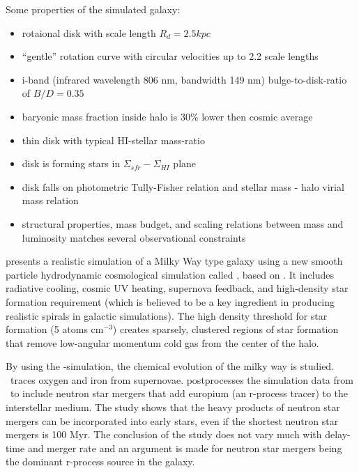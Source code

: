 Some properties of the simulated galaxy:
\begin{itemize}
\item{rotaional disk with scale length $R_d=2.5kpc$}
\item{``gentle'' rotation curve with circular velocities up to 2.2
  scale lengths}
\item{i-band (infrared wavelength 806 nm, bandwidth 149 nm)
  bulge-to-disk-ratio of $B/D=0.35$}
\item{baryonic mass fraction inside halo is 30\% lower then
  cosmic average}
\item{thin disk with typical HI-stellar mass-ratio}
\item{disk is forming stars in $\Sigma_{sfr}-\Sigma_{HI}$ plane}
\item{disk falls on photometric Tully-Fisher relation and
  stellar mass - halo virial mass relation}
\item{structural properties, mass budget, and scaling relations between mass and luminosity matches several observational constraints}
\end{itemize}

\setlength{}
\begin{figure}[h]
  
\end{figure}

 presents a realistic simulation of a Milky Way type galaxy using a new smooth particle hydrodynamic cosmological simulation called \eris, based on \gasoline{}. It includes radiative cooling, cosmic UV heating, supernova feedback, and high-density star formation requirement (which is believed to be a key ingredient in producing realistic spirals in galactic simulations).
The high density threshold for star formation (5 atoms cm$^{-3}$) creates sparsely, clustered regions of star formation that remove low-angular momentum cold gas from the center of the halo. 

By using the \eris-simulation, the chemical evolution of the milky way is studied.
\eris\ traces oxygen and iron from supernovae.
 postprocesses the simulation data from \eris\ to include neutron star mergers that add europium (an r-process tracer) to the interstellar medium.
The study shows that the heavy products of neutron star mergers can be incorporated into early stars, even if the shortest neutron star mergers is 100 Myr. The conclusion of the study does not vary much with delay-time and merger rate and an argument is made for neutron star mergers being the dominant r-process source in the galaxy.

